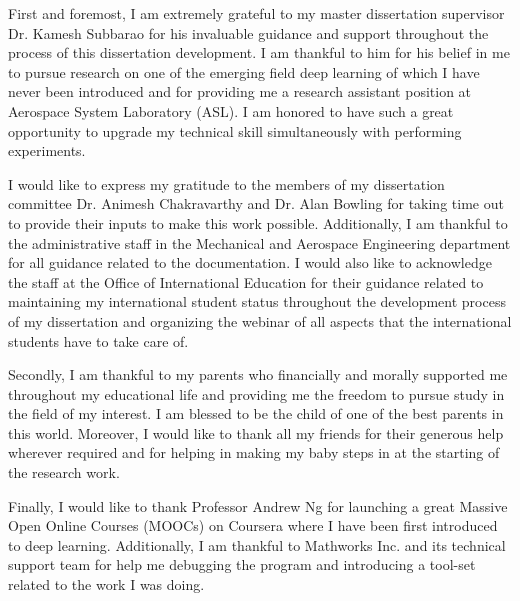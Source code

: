 First and foremost, I am extremely grateful to my master dissertation supervisor Dr. Kamesh Subbarao for his invaluable guidance and support throughout the process of this dissertation development. I am thankful to him for his belief in me to pursue research on one of the emerging field deep learning of which I have never been introduced and for providing me a research assistant position at Aerospace System Laboratory (ASL). I am honored to have such a great opportunity to upgrade my technical skill simultaneously with performing experiments. 

I would like to express my gratitude to the members of my dissertation committee Dr. Animesh Chakravarthy and Dr. Alan Bowling for taking time out to provide their inputs to make this work possible. Additionally, I am thankful to the administrative staff in the Mechanical and Aerospace Engineering department for all guidance related to the documentation. I would also like to acknowledge the staff at the Office of International Education for their guidance related to maintaining my international student status throughout the development process of my dissertation and organizing the webinar of all aspects that the international students have to take care of. 

Secondly, I am thankful to my parents who financially and morally supported me throughout my educational life and providing me the freedom to pursue study in the field of my interest. I am blessed to be the child of one of the best parents in this world. Moreover, I would like to thank all my friends for their generous help wherever required and for helping in making my baby steps in at the starting of the research work. 

Finally, I would like to thank Professor Andrew Ng for launching a great Massive Open Online Courses (MOOCs) on Coursera where I have been first introduced to deep learning. Additionally,  I am thankful to Mathworks Inc. and its technical support team for help me debugging the program and introducing a tool-set related to the work I was doing.   
    